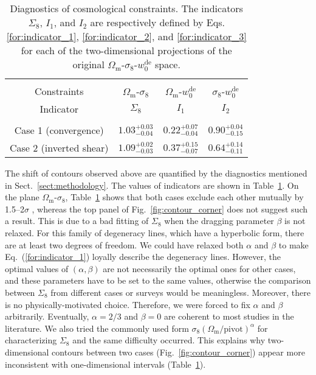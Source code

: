 \documentclass{aa} %
\newcommand{\for}[1]{Eq.~(\ref{#1})}
\newcommand{\fig}[1]{Fig.~\ref{#1}}
\newcommand{\tab}[1]{Table~\ref{#1}}
\newcommand{\sect}[1]{Sect.~\ref{#1}}
\newcommand{\OmegaM}{\Omega_\mathrm{m}}
\newcommand{\sigEig}{\sigma_8}
\newcommand{\wZero}{w_0^\mathrm{de}}
\begin{document}
\begin{table}[tb]
        \centering
        \caption{Diagnostics of cosmological constraints. The indicators $\Sigma_8$, $I_1$, and $I_2$ are respectively defined by Eqs. \eqref{for:indicator_1}, \eqref{for:indicator_2}, and \eqref{for:indicator_3} for each of the two-dimensional projections of the original $\OmegaM$-$\sigEig$-$\wZero$ space.}
        \begin{tabular}{cccc}
                \hline\hline\\[-2.0ex]
                Constraints & $\OmegaM$-$\sigEig$ & $\OmegaM$-$\wZero$ & $\sigEig$-$\wZero$ \\[0.5ex]
                Indicator               & $\Sigma_8$ & $I_1$ & $I_2$ \\
                \hline\\[-1.5ex]
                Case 1 (convergence)    & $1.03^{+0.03}_{-0.04}$ & $0.22^{+0.07}_{-0.04}$ & $0.90^{+0.04}_{-0.15}$ \\[1ex]
                Case 2 (inverted shear) & $1.09^{+0.02}_{-0.03}$ & $0.37^{+0.15}_{-0.07}$ & $0.64^{+0.14}_{-0.11}$ \\[0.5ex]
                \hline
        \end{tabular}
        \label{tab:indicators}
\end{table}

The shift of contours observed above are quantified by the diagnostics mentioned in \sect{sect:methodology}. The values of indicators are shown in \tab{tab:indicators}. On the plane $\OmegaM$-$\sigEig$, \tab{tab:indicators} shows that both cases exclude each other mutually by 1.5--2$\sigma$ , whereas the top panel of \fig{fig:contour_corner} does not suggest such a result. This is due to a bad fitting of $\Sigma_8$ when the dragging parameter $\beta$ is not relaxed. For this family of degeneracy lines, which have a hyperbolic form, there are at least two degrees of freedom. We could have relaxed both $\alpha$ and $\beta$ to make \for{for:indicator_1} loyally describe the degeneracy lines. However, the optimal values of $(\alpha, \beta)$ are not necessarily the optimal ones for other cases, and these parameters have to be set to the same values, otherwise the comparison between $\Sigma_8$ from different cases or surveys would be meaningless. Moreover, there is no physically-motivated choice. Therefore, we were forced to fix $\alpha$ and $\beta$ arbitrarily. Eventually, $\alpha=2/3$ and $\beta=0$ are coherent to most studies in the literature. We also tried the commonly used form $\sigEig(\OmegaM/\text{pivot})^\alpha$ for characterizing $\Sigma_8$ and the same difficulty occurred. This explains why two-dimensional contours between two cases (\fig{fig:contour_corner}) appear more inconsistent with one-dimensional intervals (\tab{tab:indicators}).
\end{document}
